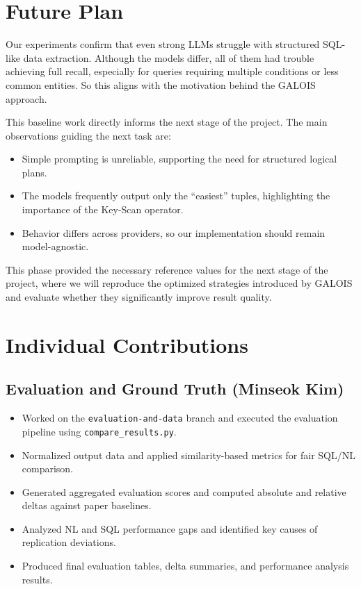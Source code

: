 \documentclass[12pt]{article}
\begin{document}
\section{Future Plan}

Our experiments confirm that even strong LLMs struggle with structured SQL-like data extraction. Although the models differ, all of them had trouble achieving full recall, especially for queries requiring multiple conditions or less common entities. So this aligns with the motivation behind the GALOIS approach.

\noindent This baseline work directly informs the next stage of the project. The main observations guiding the next task are:

\begin{itemize}
    \item Simple prompting is unreliable, supporting the need for structured logical plans.
    \item The models frequently output only the ``easiest'' tuples, highlighting the importance of the Key-Scan operator.
    \item Behavior differs across providers, so our implementation should remain model-agnostic.
\end{itemize}

\noindent This phase provided the necessary reference values for the next stage of the project, where we will reproduce the optimized strategies introduced by GALOIS and evaluate whether they significantly improve result quality.

\section{Individual Contributions}

\subsection{Evaluation and Ground Truth (Minseok Kim)}
\begin{itemize}
    \item Worked on the \texttt{evaluation-and-data} branch and executed the evaluation pipeline using \texttt{compare\_results.py}.
    \item Normalized output data and applied similarity-based metrics for fair SQL/NL comparison.
    \item Generated aggregated evaluation scores and computed absolute and relative deltas against paper baselines.
    \item Analyzed NL and SQL performance gaps and identified key causes of replication deviations.
    \item Produced final evaluation tables, delta summaries, and performance analysis results.
\end{itemize}
\end{document}
